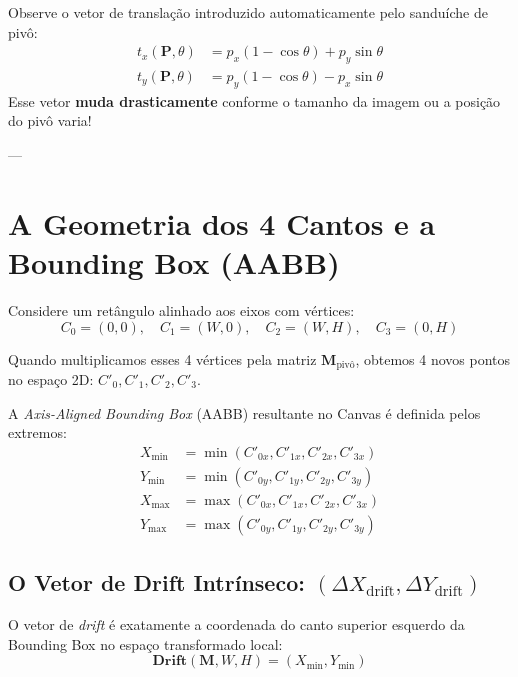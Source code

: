 \documentclass[12pt,a4paper]{article}
\begin{document}
\begin{tcolorbox}[title=A Origem Algébrica do Drift]
Observe o vetor de translação introduzido automaticamente pelo sanduíche de pivô:
\begin{align*}
t_x(\mathbf{P}, \theta) &= p_x(1 - \cos\theta) + p_y\sin\theta \\
t_y(\mathbf{P}, \theta) &= p_y(1 - \cos\theta) - p_x\sin\theta
\end{align*}
Esse vetor \textbf{muda drasticamente} conforme o tamanho da imagem ou a posição do pivô varia!
\end{tcolorbox}

---

\section{A Geometria dos 4 Cantos e a Bounding Box (AABB)}

Considere um retângulo alinhado aos eixos com vértices:
\begin{equation}
C_0 = (0, 0), \quad C_1 = (W, 0), \quad C_2 = (W, H), \quad C_3 = (0, H)
\end{equation}

Quando multiplicamos esses 4 vértices pela matriz $\mathbf{M}_{\text{pivô}}$, obtemos 4 novos pontos no espaço 2D: $C'_0, C'_1, C'_2, C'_3$.

A \textit{Axis-Aligned Bounding Box} (AABB) resultante no Canvas é definida pelos extremos:
\begin{align}
X_{\min} &= \min(C'_{0x}, C'_{1x}, C'_{2x}, C'_{3x}) \\
Y_{\min} &= \min(C'_{0y}, C'_{1y}, C'_{2y}, C'_{3y}) \\
X_{\max} &= \max(C'_{0x}, C'_{1x}, C'_{2x}, C'_{3x}) \\
Y_{\max} &= \max(C'_{0y}, C'_{1y}, C'_{2y}, C'_{3y})
\end{align}

\subsection{O Vetor de Drift Intrínseco: $(\Delta X_{\text{drift}}, \Delta Y_{\text{drift}})$}

O vetor de \textit{drift} é exatamente a coordenada do canto superior esquerdo da Bounding Box no espaço transformado local:
\begin{equation}
\mathbf{Drift}(\mathbf{M}, W, H) = (X_{\min}, Y_{\min})
\end{equation}
\end{document}
